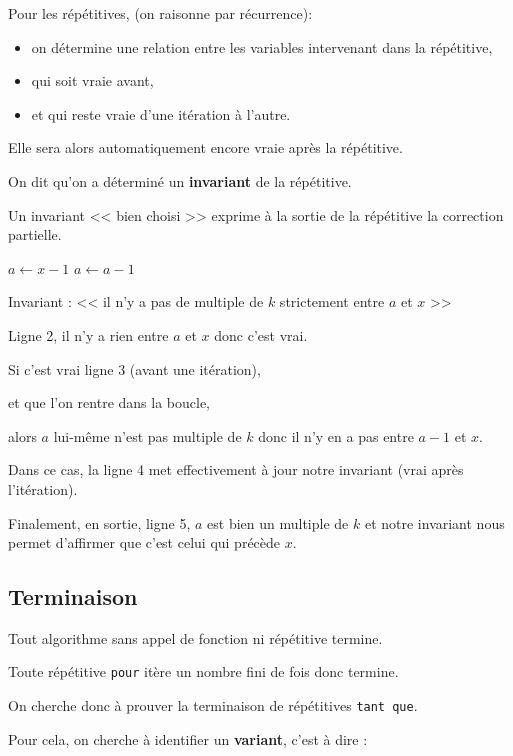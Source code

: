 Pour les répétitives, (on raisonne par récurrence):
\begin{itemize}
	\item on détermine une relation entre les variables intervenant dans la répétitive,
	\item qui soit vraie avant,
	\item et qui reste vraie d'une itération à l'autre.
\end{itemize}

Elle sera alors automatiquement encore vraie après la répétitive.

On dit qu'on a déterminé un {\bfseries invariant} de la répétitive.

Un invariant << bien choisi >> exprime à la sortie de la répétitive la correction partielle.

\begin{algorithm}[H]
{
  $a\leftarrow x-1$\;
    {$a\leftarrow a-1$\;}
  \;
}
\end{algorithm}

Invariant : << il n'y a pas de multiple de $k$ strictement entre $a$ et $x$ >>

Ligne 2, il n'y a rien entre $a$ et $x$ donc c'est vrai.

Si c'est vrai ligne 3 (avant une itération),

\quad et que l'on rentre dans la boucle, 

\quad alors $a$ lui-même n'est  pas multiple de $k$ donc il n'y en a pas entre $a-1$ et $x$.

\quad Dans ce cas, la ligne 4 met effectivement à jour notre invariant (vrai après l'itération).

Finalement, en sortie, ligne 5, $a$ est bien un multiple de $k$ et notre invariant nous permet d'affirmer que c'est celui qui précède $x$.


\subsection{Terminaison}

Tout algorithme sans appel de fonction ni répétitive termine.

Toute répétitive \texttt{pour} itère un nombre fini de fois donc termine.

On cherche donc à prouver la terminaison de répétitives \texttt{tant que}.

Pour cela, on cherche à identifier un {\bfseries variant}, c'est à dire :

